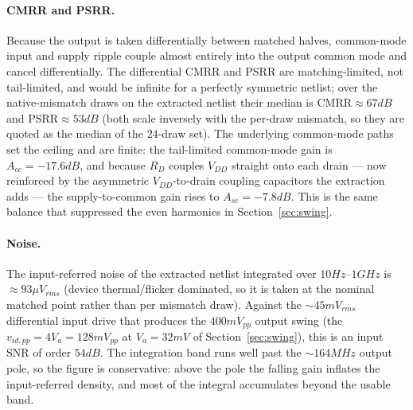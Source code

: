 \documentclass{article}
\begin{document}
\paragraph{CMRR and PSRR.} Because the output is taken differentially between
matched halves, common-mode input and supply ripple couple almost entirely into the
output common mode and cancel differentially. The differential CMRR and
PSRR are matching-limited, not tail-limited, and would be infinite for a perfectly
symmetric netlist; over the native-mismatch draws on the extracted netlist their median
is $\text{CMRR}\approx67dB$ and $\text{PSRR}\approx53dB$ (both scale inversely with the
per-draw mismatch, so they are quoted as the median of the $24$-draw set). The
underlying common-mode paths set the ceiling and are finite: the tail-limited
common-mode gain is $A_{cc}=-17.6dB$, and because $R_D$ couples $V_{DD}$ straight onto
each drain --- now reinforced by the asymmetric $V_{DD}$-to-drain coupling capacitors
the extraction adds --- the supply-to-common gain rises to $A_{sc}=-7.8dB$. This is
the same balance that suppressed the even harmonics in Section~\ref{sec:swing}.

\paragraph{Noise.} The input-referred noise of the extracted netlist integrated over
$10Hz$--$1GHz$ is $\approx93\mu V_{rms}$ (device thermal/flicker dominated, so it is
taken at the nominal matched point rather than per mismatch draw). Against the
$\sim45mV_{rms}$ differential input drive that produces the $400mV_{pp}$ output swing
(the $v_{id,pp}=4V_a=128mV_{pp}$ at $V_a=32mV$ of Section~\ref{sec:swing}), this is an
input SNR of order $54dB$. The integration band runs well past the $\sim164MHz$ output
pole, so the figure is conservative: above the pole the falling gain inflates the
input-referred density, and most of the integral accumulates beyond the usable band.
\end{document}
